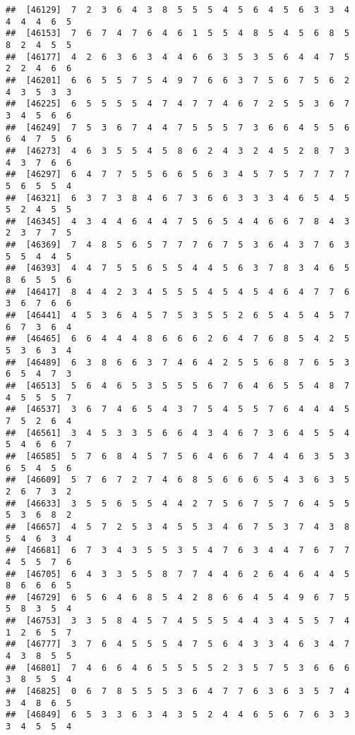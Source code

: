 \documentclass[
]{book}
\begin{document}
\begin{verbatim}
##  [46129]  7  2  3  6  4  3  8  5  5  5  4  5  6  4  5  6  3  3  4  4  4  4  6  5
##  [46153]  7  6  7  4  7  6  4  6  1  5  5  4  8  5  4  5  6  8  5  8  2  4  5  5
##  [46177]  4  2  6  3  6  3  4  4  6  6  3  5  3  5  6  4  4  7  5  2  2  4  6  6
##  [46201]  6  6  5  5  7  5  4  9  7  6  6  3  7  5  6  7  5  6  2  4  3  5  3  3
##  [46225]  6  5  5  5  5  4  7  4  7  7  4  6  7  2  5  5  3  6  7  3  4  5  6  6
##  [46249]  7  5  3  6  7  4  4  7  5  5  5  7  3  6  6  4  5  5  6  6  4  7  5  6
##  [46273]  4  6  3  5  5  4  5  8  6  2  4  3  2  4  5  2  8  7  3  4  3  7  6  6
##  [46297]  6  4  7  7  5  5  6  6  5  6  3  4  5  7  5  7  7  7  7  5  6  5  5  4
##  [46321]  6  3  7  3  8  4  6  7  3  6  6  3  3  3  4  6  5  4  5  5  2  4  5  5
##  [46345]  4  3  4  4  6  4  4  7  5  6  5  4  4  6  6  7  8  4  3  2  3  7  7  5
##  [46369]  7  4  8  5  6  5  7  7  7  6  7  5  3  6  4  3  7  6  3  5  5  4  4  5
##  [46393]  4  4  7  5  5  6  5  5  4  4  5  6  3  7  8  3  4  6  5  8  6  5  5  6
##  [46417]  8  4  4  2  3  4  5  5  5  4  5  4  5  4  6  4  7  7  6  3  6  7  6  6
##  [46441]  4  5  3  6  4  5  7  5  3  5  5  2  6  5  4  5  4  5  7  6  7  3  6  4
##  [46465]  6  6  4  4  4  8  6  6  6  2  6  4  7  6  8  5  4  2  5  5  3  6  3  4
##  [46489]  6  3  8  6  6  3  7  4  6  4  2  5  5  6  8  7  6  5  3  6  5  4  7  3
##  [46513]  5  6  4  6  5  3  5  5  5  6  7  6  4  6  5  5  4  8  7  4  5  5  5  7
##  [46537]  3  6  7  4  6  5  4  3  7  5  4  5  5  7  6  4  4  4  5  7  5  2  6  4
##  [46561]  3  4  5  3  3  5  6  6  4  3  4  6  7  3  6  4  5  5  4  5  4  6  6  7
##  [46585]  5  7  6  8  4  5  7  5  6  4  6  6  7  4  4  6  3  5  3  6  5  4  5  6
##  [46609]  5  7  6  7  2  7  4  6  8  5  6  6  6  5  4  3  6  3  5  2  6  7  3  2
##  [46633]  3  5  5  6  5  5  4  4  2  7  5  6  7  5  7  6  4  5  5  5  3  6  8  2
##  [46657]  4  5  7  2  5  3  4  5  5  3  4  6  7  5  3  7  4  3  8  5  4  6  3  4
##  [46681]  6  7  3  4  3  5  5  3  5  4  7  6  3  4  4  7  6  7  7  4  5  5  7  6
##  [46705]  6  4  3  3  5  5  8  7  7  4  4  6  2  6  4  6  4  4  5  8  6  6  6  5
##  [46729]  6  5  6  4  6  8  5  4  2  8  6  6  4  5  4  9  6  7  5  5  8  3  5  4
##  [46753]  3  3  5  8  4  5  7  4  5  5  5  4  4  3  4  5  5  7  4  1  2  6  5  7
##  [46777]  3  7  6  4  5  5  5  4  7  5  6  4  3  3  4  6  3  4  7  4  3  8  5  5
##  [46801]  7  4  6  6  4  6  5  5  5  5  2  3  5  7  5  3  6  6  6  3  8  5  5  4
##  [46825]  0  6  7  8  5  5  5  3  6  4  7  7  6  3  6  3  5  7  4  3  4  8  6  5
##  [46849]  6  5  3  3  6  3  4  3  5  2  4  4  6  5  6  7  6  3  3  3  4  5  5  4

\end{verbatim}
\end{document}
